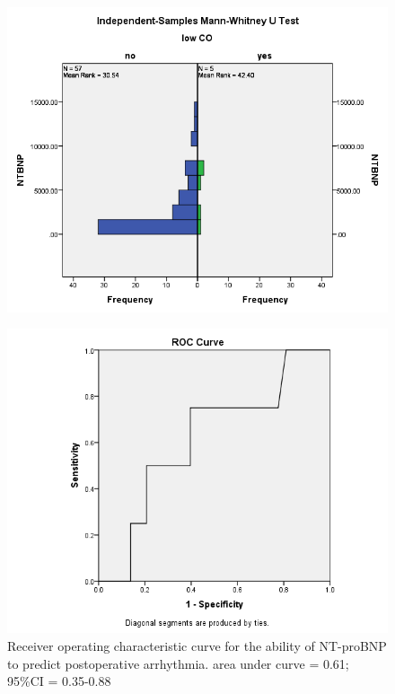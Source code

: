 \documentclass[14pt,a4paper,onecolumn]{extarticle}
\begin{document}
\clearpage
\begin{figure}
    \centering
    \includegraphics[scale=0.7]{./images/manwhit_low_co.png}
    \caption{}
    \label{}
\end{figure}

\clearpage
\begin{figure}
    \centering
    \includegraphics[scale=0.7]{./images/roc_arrhythmia.png}
    \caption{Receiver operating characteristic curve for the ability of NT-proBNP to predict postoperative arrhythmia.  area under curve = 0.61; 95\%CI = 0.35-0.88}
    \label{}
\end{figure}
\end{document}
